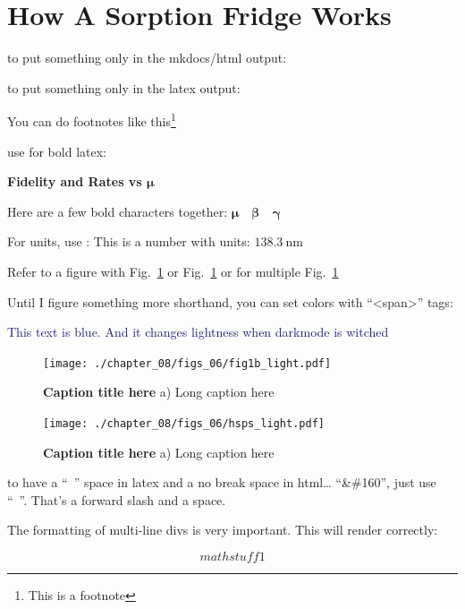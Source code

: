 \documentclass[11pt]{caltech_thesis} %
\begin{document}
\hypertarget{how-a-sorption-fridge-works}{%
\section{How A Sorption Fridge Works}\label{how-a-sorption-fridge-works}}

to put something only in the mkdocs/html output:

to put something only in the latex output:

You can do footnotes like this\footnote{This is a footnote}

use \boldsymbol for bold latex:

\textbf{Fidelity and Rates vs $\boldsymbol \mu$}

Here are a few bold characters together: $\boldsymbol{\mu \quad \beta \quad \gamma}$

For units, use :
This is a number with units: $138.3~\mathrm{nm}$

Refer to a figure with Fig.~\ref{fig:figurename} or Fig.~\ref{fig:figurename} or for multiple Fig.~\ref{fig:figurename}

Until I figure something more shorthand, you can set colors with ``\textless span\textgreater{}'' tags:

\textcolor{midnightblue}{ This text is blue. And it changes lightness when darkmode is witched }

\hypertarget{fig:figurename}{%
\begin{figure}
\centering
\texttt{[image: ./chapter\_08/figs\_06/fig1b\_light.pdf]}
\caption[{Figure label for in thesis index here.}]{\textbf{Caption title here} a) Long caption here}
\label{fig:figurename}
\end{figure}
}

\hypertarget{fig:figurename2}{%
\begin{figure}
\centering
\texttt{[image: ./chapter\_08/figs\_06/hsps\_light.pdf]}
\caption[{Figure label for in thesis index here.}]{\textbf{Caption title here} a) Long caption here}
\label{fig:figurename2}
\end{figure}
}

to have a ``~'' space in latex and a no break space in html\ldots{} ``\&\#160'', just use ``~''. That's a forward slash and a space.

The formatting of multi-line divs is very important. This will render correctly:

{\color{midnightblue} 

$$math stuff 1$$

}
\end{document}
